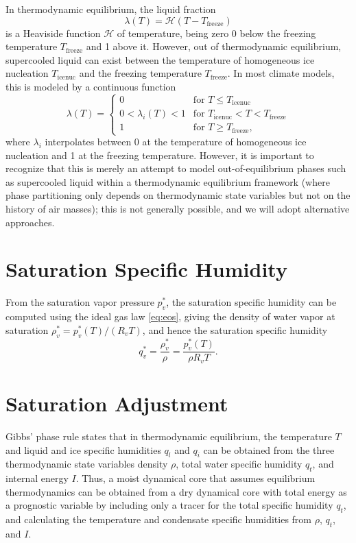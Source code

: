 \documentclass{report}
\begin{document}
In thermodynamic equilibrium, the liquid fraction 
\begin{equation}\label{e:liquid_fraction}
    \lambda(T) = \mathcal{H}(T-T_{\mathrm{freeze}})
\end{equation} 
is a Heaviside function $\mathcal{H}$ of temperature, being zero 0 below the freezing temperature $T_{\mathrm{freeze}}$ and 1 above it. However, out of thermodynamic equilibrium, supercooled liquid can exist between the temperature of homogeneous ice nucleation $T_{\mathrm{icenuc}}$ and the freezing temperature $T_{\mathrm{freeze}}$. In most climate models, this is modeled by a continuous function 
\begin{equation}
    \lambda(T) = 
    \begin{cases}
    0 & \text{for } T\le T_{\mathrm{icenuc}}\\
    0<\lambda_i(T)<1 & \text{for } T_{\mathrm{icenuc}} < T <  T_{\mathrm{freeze}}\\
    1   & \text{for } T\ge T_{\mathrm{freeze}},
    \end{cases}
\end{equation} 
where $\lambda_i$ interpolates between 0 at the temperature of homogeneous ice nucleation and 1 at the freezing temperature. However, it is important to recognize that this is merely an attempt to model out-of-equilibrium phases such as supercooled liquid within a thermodynamic equilibrium framework (where phase partitioning only depends on thermodynamic state variables but not on the history of air masses); this is not generally possible, and we will adopt alternative approaches.

\section{Saturation Specific Humidity}
\label{sct:sat_spef_hum}
From the saturation vapor pressure $p_v^*$, the saturation specific humidity can be computed using the ideal gas law \eqref{eq:eos}, giving the density of water vapor at saturation $\rho_v^* = p_v^*(T)/(R_v T)$, and hence the saturation specific humidity 
\begin{equation}\label{eq:sat_shum}
     q_v^* = \frac{\rho_v^*}{\rho} = \frac{p_v^*(T)}{\rho R_v T}.
\end{equation}

\section{Saturation Adjustment}
\label{sct:sat_adj}
Gibbs' phase rule states that in thermodynamic equilibrium, the temperature $T$ and liquid and ice specific humidities $q_l$ and $q_i$ can be obtained from the three thermodynamic state variables density $\rho$, total water specific humidity $q_t$, and internal energy $I$. Thus, a moist dynamical core that assumes equilibrium thermodynamics can be obtained from a dry dynamical core with total energy as a prognostic variable by including only a tracer for the total specific humidity $q_t$, and calculating the temperature and condensate specific humidities from $\rho$, $q_t$, and $I$. 
\end{document}
